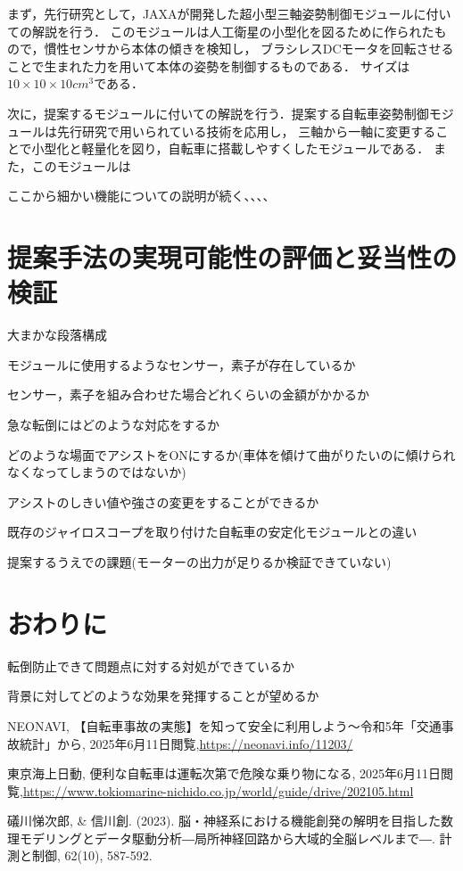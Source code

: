 \documentclass[uplatex,dvipdfmx]{jsarticle}
\begin{document}
まず，先行研究として，JAXAが開発した超小型三軸姿勢制御モジュールに付いての解説を行う．\cite{jaxaModule}
このモジュールは人工衛星の小型化を図るために作られたもので，慣性センサから本体の傾きを検知し，
ブラシレスDCモータを回転させることで生まれた力を用いて本体の姿勢を制御するものである．
サイズは$10×10×10 {cm}^3$である．

次に，提案するモジュールに付いての解説を行う．提案する自転車姿勢制御モジュールは先行研究で用いられている技術を応用し，
三軸から一軸に変更することで小型化と軽量化を図り，自転車に搭載しやすくしたモジュールである．
また，このモジュールは

ここから細かい機能についての説明が続く、、、、







\section{提案手法の実現可能性の評価と妥当性の検証}
%
大まかな段落構成

モジュールに使用するようなセンサー，素子が存在しているか

センサー，素子を組み合わせた場合どれくらいの金額がかかるか

急な転倒にはどのような対応をするか

どのような場面でアシストをONにするか(車体を傾けて曲がりたいのに傾けられなくなってしまうのではないか)

アシストのしきい値や強さの変更をすることができるか

既存のジャイロスコープを取り付けた自転車の安定化モジュールとの違い

提案するうえでの課題(モーターの出力が足りるか検証できていない)

\section{おわりに}

転倒防止できて問題点に対する対処ができているか

背景に対してどのような効果を発揮することが望めるか




\begin{thebibliography}{9}

 NEONAVI, 【自転車事故の実態】を知って安全に利用しよう～令和5年「交通事故統計」から, 
2025年6月11日閲覧,\url{https://neonavi.info/11203/}

 東京海上日動, 便利な自転車は運転次第で危険な乗り物になる, 
2025年6月11日閲覧,\url{https://www.tokiomarine-nichido.co.jp/world/guide/drive/202105.html}

 礒川悌次郎, \& 信川創. (2023). 脳・神経系における機能創発の解明を目指した数理モデリングとデータ駆動分析―局所神経回路から大域的全脳レベルまで―. 計測と制御, 62(10), 587-592.

\end{thebibliography}
\end{document}
